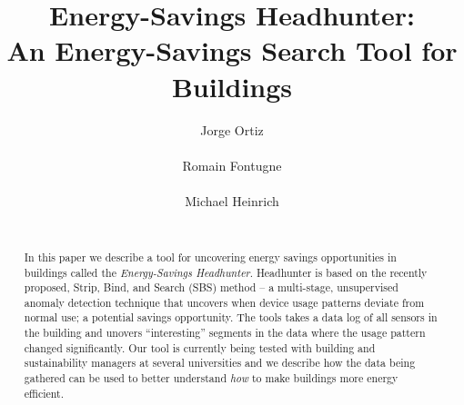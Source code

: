 \documentclass{sig-alternate-ipsn13}
\title{Energy-Savings Headhunter: \\An Energy-Savings Search Tool for Buildings}
\author{
%
%
\alignauthor
Jorge Ortiz\\
       \affaddr{U.C. Berkeley}\\
       \email{jortiz@cs.berkeley.edu}
\alignauthor
Romain Fontugne\\
       \affaddr{University of Tokyo}\\
       \email{romain@hongo.wide.ad.jp}
\alignauthor Michael Heinrich\\
       \affaddr{Pangia Corporation}\\
       \email{michael@greenpangia.com}
}
\begin{document}
\maketitle

\begin{abstract}
In this paper we describe a tool for uncovering energy savings opportunities in buildings called 
the \emph{Energy-Savings Headhunter}.  Headhunter is based on the recently proposed, Strip, Bind, and
Search (SBS) method -- a multi-stage, unsupervised anomaly detection technique that uncovers when device
usage patterns deviate from normal use; a potential savings opportunity.  The tools
takes a data log of all sensors in the building and unovers ``interesting'' segments in the data
where the usage pattern changed significantly.  Our tool is 
currently being tested with building and sustainability managers at several universities and we  
describe how the data being gathered can be used to better understand \emph{how} to make buildings
more energy efficient.
\end{abstract}










\end{document}
